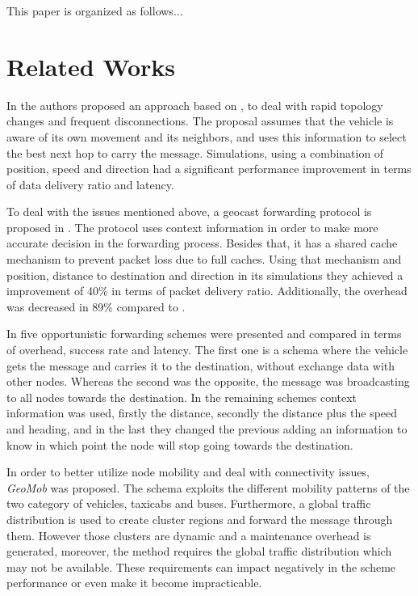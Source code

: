 \documentclass[conference]{IEEEtran}
\begin{document}
This paper is organized as follows...



\section{Related Works}

In \cite{magf2009} the authors  proposed an approach based on \cite{gpsr2000}, to deal with rapid topology changes and frequent disconnections. The proposal assumes that the vehicle is aware of its own movement and its neighbors, and uses this information to select the best next hop to carry the message. Simulations, using a combination of position, speed and direction had a significant performance improvement in terms of data delivery ratio and latency.

To deal with the issues mentioned above, a geocast forwarding protocol is proposed in \cite{vcarp2012}. The protocol uses context information in order to make more accurate decision in the forwarding process. Besides that, it has a shared cache mechanism to prevent packet loss due to full caches. Using that mechanism and position, distance to destination and direction in its simulations they achieved a improvement of 40\% in terms of packet delivery ratio. Additionally, the overhead was decreased in 89\% compared to \cite{maihofer2004}.

In \cite{move2005} five opportunistic forwarding schemes were presented and compared in terms of overhead, success rate and latency. The first one is a schema where the vehicle gets the message and carries it to the destination, without exchange data with other nodes. Whereas the second was the opposite, the message was broadcasting to all nodes towards the destination. In the remaining schemes context information was used, firstly the distance, secondly the distance plus the speed and heading, and in the last they changed the previous adding an information to know in which point the node will stop going towards the destination.

In order to better utilize node mobility and deal with connectivity issues, \emph{GeoMob} \cite{zhang2014} was proposed. The schema exploits the different mobility patterns of the two category of vehicles, taxicabs and buses. Furthermore, a global traffic distribution is used to create cluster regions and forward the message through them. However those clusters are dynamic and a maintenance overhead is generated, moreover, the method requires the global traffic distribution which may not be available. These requirements can impact negatively in the scheme performance or even make it become impracticable.
\end{document}
